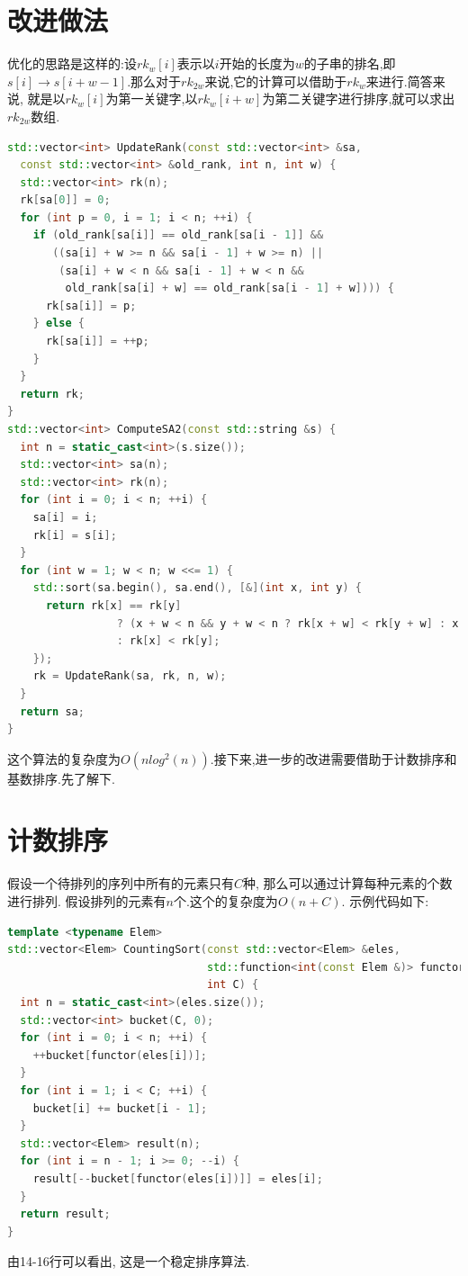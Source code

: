 \documentclass{article}
\begin{document}
\section{改进做法}
优化的思路是这样的:设$rk_{w}[i]$表示以$i$开始的长度为$w$的子串的排名,即$s[i]\rightarrow s[i+w-1]$.那么对于$rk_{2w}$来说,它的计算可以借助于$rk_{w}$来进行.简答来说, 就是以$rk_{w}[i]$为第一关键字,以$rk_{w}[i+w]$为第二关键字进行排序,就可以求出$rk_{2w}$数组.
\begin{lstlisting}[language=C++, caption={Better}]
std::vector<int> UpdateRank(const std::vector<int> &sa,
  const std::vector<int> &old_rank, int n, int w) {
  std::vector<int> rk(n);
  rk[sa[0]] = 0;
  for (int p = 0, i = 1; i < n; ++i) {
    if (old_rank[sa[i]] == old_rank[sa[i - 1]] &&
       ((sa[i] + w >= n && sa[i - 1] + w >= n) ||
        (sa[i] + w < n && sa[i - 1] + w < n &&
         old_rank[sa[i] + w] == old_rank[sa[i - 1] + w]))) {
      rk[sa[i]] = p;
    } else {
      rk[sa[i]] = ++p;
    }
  }
  return rk;
}
std::vector<int> ComputeSA2(const std::string &s) {
  int n = static_cast<int>(s.size());
  std::vector<int> sa(n);
  std::vector<int> rk(n);
  for (int i = 0; i < n; ++i) {
    sa[i] = i;
    rk[i] = s[i];
  }
  for (int w = 1; w < n; w <<= 1) {
    std::sort(sa.begin(), sa.end(), [&](int x, int y) {
      return rk[x] == rk[y]
                 ? (x + w < n && y + w < n ? rk[x + w] < rk[y + w] : x + w >= n)
                 : rk[x] < rk[y];
    });
    rk = UpdateRank(sa, rk, n, w);
  }
  return sa;
}
\end{lstlisting}
这个算法的复杂度为$O(nlog^{2}(n))$.接下来,进一步的改进需要借助于计数排序和基数排序.先了解下.

\section{计数排序}
假设一个待排列的序列中所有的元素只有$C$种, 那么可以通过计算每种元素的个数进行排列. 假设排列的元素有$n$个.这个的复杂度为$O(n+C)$. 示例代码如下: \par
\begin{lstlisting}[language=C++, caption={Counting Sort}]
template <typename Elem>
std::vector<Elem> CountingSort(const std::vector<Elem> &eles,
                               std::function<int(const Elem &)> functor,
                               int C) {
  int n = static_cast<int>(eles.size());
  std::vector<int> bucket(C, 0);
  for (int i = 0; i < n; ++i) {
    ++bucket[functor(eles[i])];
  }
  for (int i = 1; i < C; ++i) {
    bucket[i] += bucket[i - 1];
  }
  std::vector<Elem> result(n);
  for (int i = n - 1; i >= 0; --i) {
    result[--bucket[functor(eles[i])]] = eles[i];
  }
  return result;
}
\end{lstlisting}
由14-16行可以看出, 这是一个稳定排序算法.
\end{document}
